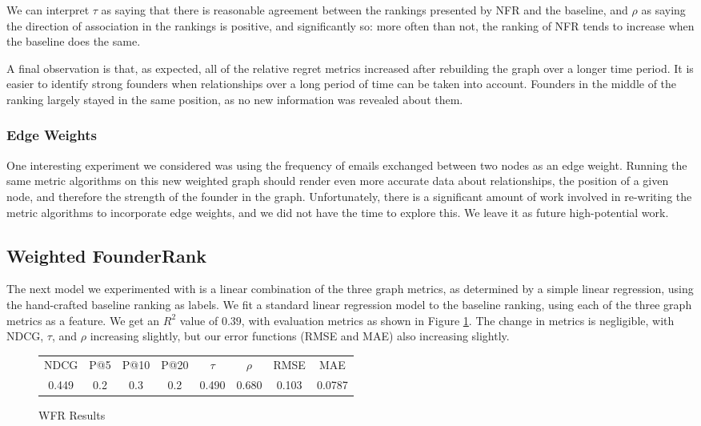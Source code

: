 We can interpret $\tau$ as saying that there is reasonable agreement between the rankings presented by NFR and the baseline, and $\rho$ as saying the direction of association in the rankings is positive, and significantly so: more often than not, the ranking of NFR tends to increase when the baseline does the same.

A final observation is that, as expected, all of the relative regret metrics increased after rebuilding the graph over a longer time period. It is easier to identify strong founders when relationships over a long period of time can be taken into account. Founders in the middle of the ranking largely stayed in the same position, as no new information was revealed about them.

\subsubsection{Edge Weights}

One interesting experiment we considered was using the frequency of emails exchanged between two nodes as an edge weight. Running the same metric algorithms on this new weighted graph should render even more accurate data about relationships, the position of a given node, and therefore the strength of the founder in the graph. Unfortunately, there is a significant amount of work involved in re-writing the metric algorithms to incorporate edge weights, and we did not have the time to explore this. We leave it as future high-potential work.

\subsection{Weighted FounderRank}

The next model we experimented with is a linear combination of the three graph metrics, as determined by a simple linear regression, using the hand-crafted baseline ranking as labels. We fit a standard linear regression model to the baseline ranking, using each of the three graph metrics as a feature. We get an $R^2$ value of $0.39$, with evaluation metrics as shown in Figure \ref{fig:wfr:results}. The change in metrics is negligible, with NDCG, $\tau$, and $\rho$ increasing slightly, but our error functions (RMSE and MAE) also increasing slightly.

\begin{figure}[ht]
\begin{tabular}{c | c | c | c | c | c | c | c}
NDCG & P@5 & P@10 & P@20 & $\tau$ & $\rho$ & RMSE & MAE  \\
0.449 & 0.2 & 0.3 & 0.2 & 0.490 & 0.680 & 0.103 & 0.0787 \\
\end{tabular}
\centering
\caption{WFR Results}
\label{fig:wfr:results}
\end{figure}

